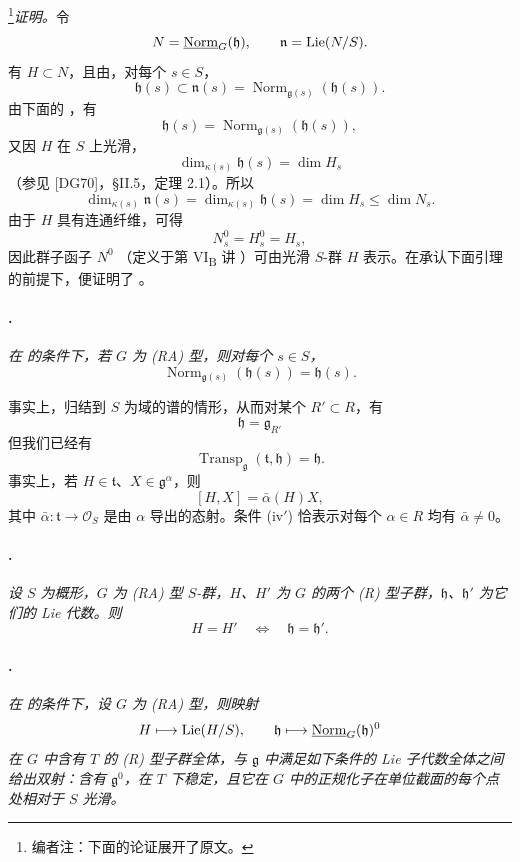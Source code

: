 \footnote{编者注：下面的论证展开了原文。}\emph{证明。}令
\[
  N=\underline{\operatorname{Norm}}_G(\mathfrak h),
  \qquad
  \mathfrak n=\operatorname{Lie}(N/S).
\]
有 \(H\subset N\)，且由，对每个 \(s\in S\)，
\[
  \mathfrak h(s)
  \subset
  \mathfrak n(s)
  =
  \operatorname{Norm}_{\mathfrak g(s)}(\mathfrak h(s)).
\]
由下面的 ，有
\[
  \mathfrak h(s)
  =
  \operatorname{Norm}_{\mathfrak g(s)}(\mathfrak h(s)),
\]
又因 \(H\) 在 \(S\) 上光滑，
\[
  \dim_{\kappa(s)}\mathfrak h(s)=\dim H_s
\]
\textup{（参见 \textup{[DG70]}，\S II.5，定理 2.1）}。所以
\[
  \dim_{\kappa(s)}\mathfrak n(s)
  =
  \dim_{\kappa(s)}\mathfrak h(s)
  =
  \dim H_s
  \leq
  \dim N_s.
\]
由于 \(H\) 具有连通纤维，可得
\[
  N_s^0=H_s^0=H_s,
\]
因此群子函子 \(N^0\) \textup{（定义于第 VI\textsubscript{B} 讲 ）}可由光滑 \(S\)-群 \(H\) 表示。在承认下面引理的前提下，便证明了 。

\paragraph{.}
\textit{在  的条件下，若 \(G\) 为 \textup{(RA)} 型，则对每个 \(s\in S\)，}
\[
  \operatorname{Norm}_{\mathfrak g(s)}(\mathfrak h(s))
  =
  \mathfrak h(s).
\]

事实上，归结到 \(S\) 为域的谱的情形，从而对某个 \(R'\subset R\)，有
\[
  \mathfrak h=\mathfrak g_{R'}
\]
但我们已经有
\[
  \operatorname{Transp}_{\mathfrak g}
    (\mathfrak t,\mathfrak h)
  =
  \mathfrak h.
\]
事实上，若 \(H\in\mathfrak t\)、\(X\in\mathfrak g^\alpha\)，则
\[
  [H,X]=\bar\alpha(H)X,
\]
其中 \(\bar\alpha:\mathfrak t\to\mathcal O_S\) 是由 \(\alpha\) 导出的态射。条件 \textup{(iv$'$)} 恰表示对每个 \(\alpha\in R\) 均有 \(\bar\alpha\ne0\)。

\paragraph{.}
\textit{设 \(S\) 为概形，\(G\) 为 \textup{(RA)} 型 \(S\)-群，\(H\)、\(H'\) 为 \(G\) 的两个 \textup{(R)} 型子群，\(\mathfrak h\)、\(\mathfrak h'\) 为它们的 Lie 代数。则}
\[
  H=H'
  \quad\Longleftrightarrow\quad
  \mathfrak h=\mathfrak h'.
\]

\paragraph{.}
\textit{在  的条件下，设 \(G\) 为 \textup{(RA)} 型，则映射}
\[
  H\longmapsto\operatorname{Lie}(H/S),
  \qquad
  \mathfrak h\longmapsto
    \underline{\operatorname{Norm}}_G(\mathfrak h)^0
\]
\textit{在 \(G\) 中含有 \(T\) 的 \textup{(R)} 型子群全体，与 \(\mathfrak g\) 中满足如下条件的 Lie 子代数全体之间给出双射：含有 \(\mathfrak g^0\)，在 \(T\) 下稳定，且它在 \(G\) 中的正规化子在单位截面的每个点处相对于 \(S\) 光滑。}

